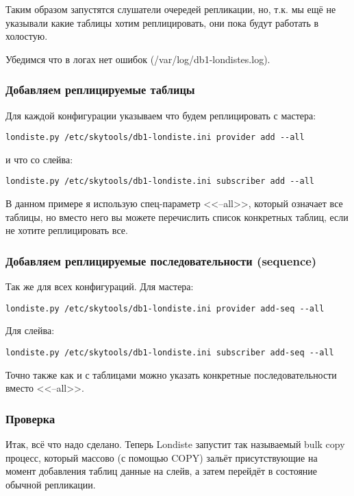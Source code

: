Таким образом запустятся слушатели очередей репликации, но, т.к. мы ещё не
указывали какие таблицы хотим реплицировать, они пока будут работать в холостую.

Убедимся что в логах нет ошибок (/var/log/db1-londistes.log).

\subsubsection{Добавляем реплицируемые таблицы}
Для каждой конфигурации указываем что будем реплицировать с мастера:
\begin{lstlisting}[label=lst:londiste13,caption=Добавляем реплицируемые таблицы]
londiste.py /etc/skytools/db1-londiste.ini provider add --all
\end{lstlisting}
и что со слейва:
\begin{lstlisting}[label=lst:londiste14,caption=Добавляем реплицируемые таблицы]
londiste.py /etc/skytools/db1-londiste.ini subscriber add --all
\end{lstlisting}

В данном примере я использую спец-параметр <<--all>>, который означает все таблицы,
но вместо него вы можете перечислить список конкретных таблиц, если не хотите
реплицировать все.

\subsubsection{Добавляем реплицируемые последовательности (sequence)}
Так же для всех конфигураций.
Для мастера:
\begin{lstlisting}[label=lst:londiste15,caption=Добавляем последовательности]
londiste.py /etc/skytools/db1-londiste.ini provider add-seq --all
\end{lstlisting}
Для слейва:
\begin{lstlisting}[label=lst:londiste16,caption=Добавляем реплицируемые таблицы]
londiste.py /etc/skytools/db1-londiste.ini subscriber add-seq --all
\end{lstlisting}

Точно также как и с таблицами можно указать конкретные последовательности вместо <<--all>>.

\subsubsection{Проверка}
Итак, всё что надо сделано. Теперь Londiste запустит так называемый bulk copy
процесс, который массово (с помощью COPY) зальёт присутствующие на момент
добавления таблиц данные на слейв, а затем перейдёт в состояние обычной репликации.

